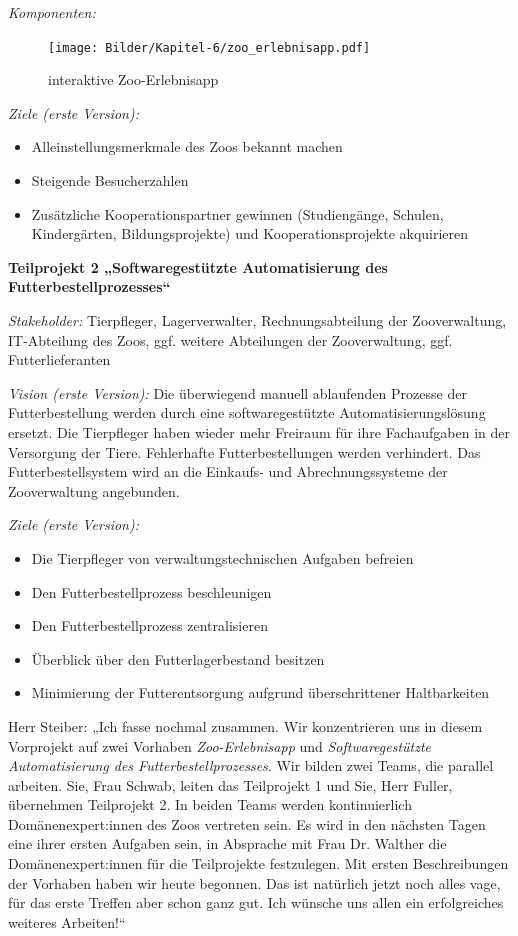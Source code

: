 \vspace{1em}

\textit{Komponenten:}
\begin{figure}[h!]
	\centering
	\texttt{[image: Bilder/Kapitel-6/zoo\_erlebnisapp.pdf]}
	\caption{interaktive Zoo-Erlebnisapp}
	\label{fig:zoo_erlebnisapp}
\end{figure}

\textit{Ziele (erste Version):}
\begin{itemize}
	\item Alleinstellungsmerkmale des Zoos bekannt machen
	\item Steigende Besucherzahlen
	\item Zusätzliche Kooperationspartner gewinnen (Studiengänge, Schulen, Kindergärten, Bildungsprojekte) und Kooperationsprojekte akquirieren
\end{itemize}

\vspace{1em}

\textbf{Teilprojekt 2 „Softwaregestützte Automatisierung des Futterbestellprozesses“}

\textit{Stakeholder:} Tierpfleger, Lagerverwalter, Rechnungsabteilung der Zooverwaltung, IT-Abteilung des Zoos, ggf. weitere Abteilungen der Zooverwaltung, ggf. Futterlieferanten

\textit{Vision (erste Version):} Die überwiegend manuell ablaufenden Prozesse der Futterbestellung werden durch eine softwaregestützte Automatisierungslösung ersetzt. Die Tierpfleger haben wieder mehr Freiraum für ihre Fachaufgaben in der Versorgung der Tiere. Fehlerhafte Futterbestellungen werden verhindert. Das Futterbestellsystem wird an die Einkaufs- und Abrechnungssysteme der Zooverwaltung angebunden.

\textit{Ziele (erste Version):}
\begin{itemize}
	\item Die Tierpfleger von verwaltungstechnischen Aufgaben befreien
	\item Den Futterbestellprozess beschleunigen
	\item Den Futterbestellprozess zentralisieren
	\item Überblick über den Futterlagerbestand besitzen
	\item Minimierung der Futterentsorgung aufgrund überschrittener Haltbarkeiten
\end{itemize}


Herr Steiber: „Ich fasse nochmal zusammen. Wir konzentrieren uns in diesem Vorprojekt auf zwei Vorhaben \textit{Zoo-Erlebnisapp} und \textit{Softwaregestützte Automatisierung des Futterbestellprozesses}. Wir bilden zwei Teams, die parallel arbeiten. Sie, Frau Schwab, leiten das Teilprojekt 1 und Sie, Herr Fuller, übernehmen Teilprojekt 2. In beiden Teams werden kontinuierlich Domänenexpert:innen des Zoos vertreten sein. Es wird in den nächsten Tagen eine ihrer ersten Aufgaben sein, in Absprache mit Frau Dr. Walther die Domänenexpert:innen für die Teilprojekte festzulegen. Mit ersten Beschreibungen der Vorhaben haben wir heute begonnen. Das ist natürlich jetzt noch alles vage, für das erste Treffen aber schon ganz gut. Ich wünsche uns allen ein erfolgreiches weiteres Arbeiten!“